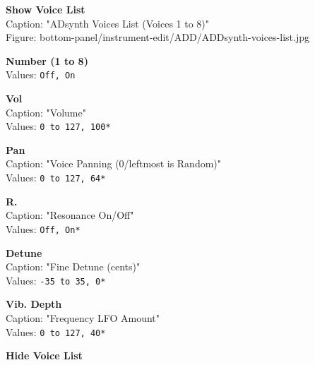 \documentclass[
 11pt,
 twoside,
 a4paper,
 headinclude,
 footinclude,
 final                                 %
]{article}
\begin{document}
\begin{enumber}
\begin{enumber}
\begin{enumber}
         \item \textbf{Show Voice List} \\
            Caption: "ADsynth Voices List (Voices 1 to 8)" \\
            Figure: bottom-panel/instrument-edit/ADD/ADDsynth-voices-list.jpg
            \begin{enumber}
               \item \textbf{Number (1 to 8)} \\
                  Values: \texttt{Off, On}
               \item \textbf{Vol} \\
                  Caption: "Volume" \\
                  Values: \texttt{0 to 127, 100*}
               \item \textbf{Pan} \\
                  Caption: "Voice Panning (0/leftmost is Random)" \\
                  Values: \texttt{0 to 127, 64*}
               \item \textbf{R.} \\
                  Caption: "Resonance On/Off" \\
                  Values: \texttt{Off, On*}
               \item \textbf{Detune} \\
                  Caption: "Fine Detune (cents)" \\
                  Values: \texttt{-35 to 35, 0*}
               \item \textbf{Vib. Depth} \\
                  Caption: "Frequency LFO Amount" \\
                  Values: \texttt{0 to 127, 40*}
               \item \textbf{Hide Voice List} \\
            \end{enumber}


\end{enumber}
\end{enumber}
\end{enumber}
\end{document}

